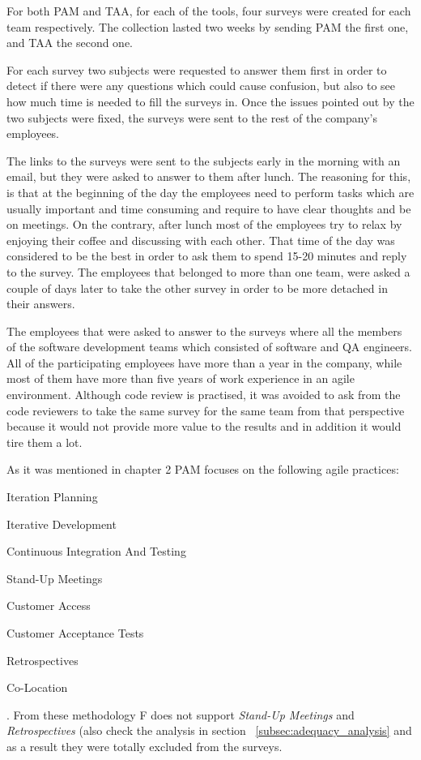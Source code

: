 For both PAM and TAA, for each of the tools, four surveys were created for each team respectively. The collection lasted two weeks by sending PAM the first one, and TAA the second one.

For each survey two subjects were requested to answer them first in order to detect if there were any questions which could cause confusion, but also to see how much time is needed to fill the surveys in. Once the issues pointed out by the two subjects were fixed, the surveys were sent to the rest of the company's employees.

The links to the surveys were sent to the subjects early in the morning with an email, but they were asked to answer to them after lunch. The reasoning for this, is that at the beginning of the day the employees need to perform tasks which are usually important and time consuming and require to have clear thoughts and be on meetings. On the contrary, after lunch most of the employees try to relax by enjoying their coffee and discussing with each other. That time of the day was considered to be the best in order to ask them to spend 15-20 minutes and reply to the survey. The employees that belonged to more than one team, were asked a couple of days later to take the other survey in order to be more detached in their answers.

The employees that were asked to answer to the surveys where all the members of the software development teams which consisted of software and QA engineers. All of the participating employees have more than a year in the company, while most of them have more than five years of work experience in an agile environment. Although code review is practised, it was avoided to ask from the code reviewers to take the same survey for the same team from that perspective because it would not provide more value to the results and in addition it would tire them a lot.

As it was mentioned in chapter 2 PAM focuses on the following agile practices:
\begin{inparaenum} [a\upshape)]
	\item Iteration Planning
	\item Iterative Development
	\item Continuous Integration And Testing
	\item Stand-Up Meetings
	\item Customer Access
	\item Customer Acceptance Tests
	\item Retrospectives
	\item Co-Location
\end{inparaenum}
. From these methodology F does not support \textit{Stand-Up Meetings} and \textit{Retrospectives} (also check the analysis in section ~\ref{subsec:adequacy_analysis} and as a result they were totally excluded from the surveys.

